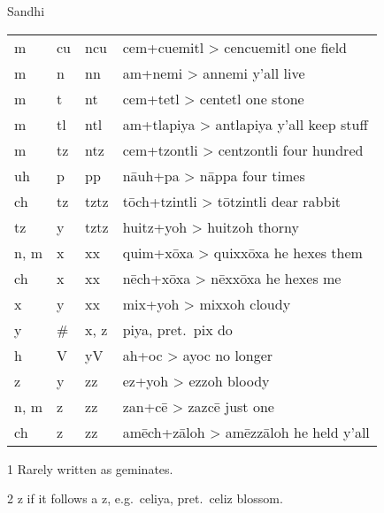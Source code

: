 \documentclass[12pt]{beamer}
\newcommand{\nah}[1]{\textcolor{nahgrn}{#1}}
\newcommand{\trs}[1]{\textcolor{nahblu}{#1}}
\begin{document}
\begin{frame}
\begin{columns}[t]
\begin{column}{.25\linewidth}
\begin{block}{Sandhi}
\begin{threeparttable}
\begin{tabular}{l@{+}l@{>}ll}
            \nah{m}    & \nah{cu} & \nah{ncu}             & \nah{cem}+\nah{cuemitl} > \nah{cencuemitl} \trs{one field}      \\
            \nah{m}    & \nah{n}  & \nah{nn}              & \nah{am}+\nah{nemi} > \nah{annemi} \trs{y'all live}             \\
            \nah{m}    & \nah{t}  & \nah{nt}              & \nah{cem}+\nah{tetl} > \nah{centetl} \trs{one stone}            \\
            \nah{m}    & \nah{tl} & \nah{ntl}             & \nah{am}+\nah{tlapiya} > \nah{antlapiya} \trs{y'all keep stuff} \\
            \nah{m}    & \nah{tz} & \nah{ntz}             & \nah{cem}+\nah{tzontli} > \nah{centzontli} \trs{four hundred}   \\
            \nah{uh}   & \nah{p}  & \nah{pp}              & \nah{nāuh}+\nah{pa} > \nah{nāppa} \trs{four times}              \\
            \nah{ch}   & \nah{tz} & \nah{tztz}\tnote{1}   & \nah{tōch}+\nah{tzintli} > \nah{tōtzintli} \trs{dear rabbit}    \\
            \nah{tz}   & \nah{y}  & \nah{tztz}\tnote{1}   & \nah{huitz}+\nah{yoh} > \nah{huitzoh} \trs{thorny}              \\
            \nah{n, m} & \nah{x}  & \nah{xx}\tnote{1}     & \nah{quim}+\nah{xōxa} > \nah{quixxōxa} \trs{he hexes them}      \\
            \nah{ch}   & \nah{x}  & \nah{xx}\tnote{1}     & \nah{nēch}+\nah{xōxa} > \nah{nēxxōxa} \trs{he hexes me}         \\
            \nah{x}    & \nah{y}  & \nah{xx}\tnote{1}     & \nah{mix}+\nah{yoh} > \nah{mixxoh} \trs{cloudy}                 \\
            \nah{y}    & \nah{\#} & \nah{x, z}\tnote{2}{} & \nah{piya}, pret.~\nah{pix} \trs{do}                            \\
            \nah{h}    & \nah{V}  & \nah{yV}              & \nah{ah}+\nah{oc} > \nah{ayoc} \trs{no longer}                  \\
            \nah{z}    & \nah{y}  & \nah{zz}\tnote{1}     & \nah{ez}+\nah{yoh} > \nah{ezzoh} \trs{bloody}                   \\
            \nah{n, m} & \nah{z}  & \nah{zz}\tnote{1}     & \nah{zan}+\nah{cē} > \nah{zazcē} \trs{just one}                 \\
            \nah{ch}   & \nah{z}  & \nah{zz}\tnote{1}     & \nah{amēch}+\nah{zāloh} > \nah{amēzzāloh} \trs{he held y'all}   \\
          \end{tabular}%
          \begin{tablenotes}
            \item[1] Rarely written as geminates.
            \item[2] \nah{z} if it follows a \nah{z}, e.g.~\nah{celiya}, pret.~\nah{celiz} \trs{blossom}.


\end{tablenotes}
\end{threeparttable}
\end{block}
\end{column}
\end{columns}
\end{frame}
\end{document}
